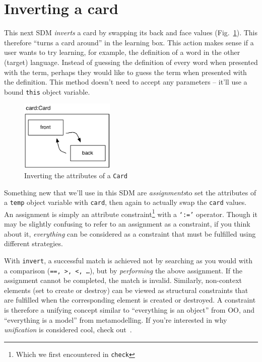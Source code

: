 \newpage
\hypertarget{sec:invertCard}{}
\section{Inverting a card}
\genHeader

This next SDM \emph{inverts} a card by swapping its back and face values (Fig.~\ref{fig:goal_invert}). This therefore ``turns a card around'' in the learning
box. This action makes sense if a user wants to try learning, for example, the definition of a word in the other (target) language. Instead of guessing the
definition of every word when presented with the term, perhaps they would like to guess the term when presented with the definition. This method doesn't need to
accept any parameters -- it'll use a bound \texttt{this} object variable.

\vspace{0.5cm}

\begin{figure}[htbp]
	\centering
    \includegraphics[width=0.4\textwidth]{goal_invert.pdf}
 	\caption{Inverting the attributes of a \texttt{Card}}
 	\label{fig:goal_invert}
\end{figure}
\FloatBarrier

Something new that we'll use in this SDM are \emph{assignments}to set the attributes of a \texttt{temp} object variable with \texttt{card},
then again to actually swap the \texttt{card} values. An assignment is simply an attribute constraint\footnote{Which we first encountered in \texttt{check}}
with a \texttt{`:='} operator. Though it may be slightly confusing to refer to an assignment as a constraint, if you think about it, \emph{everything} can be
considered as a constraint that must be fulfilled using different strategies.

With \texttt{invert}, a successful match is achieved not by searching as you would with a comparison (\texttt{==, >, <, \ldots}), but by \emph{performing} the
above assignment. If the assignment cannot be completed, the match is invalid. Similarly, non-context elements (set to create or destroy) can be viewed as
structural constraints that are fulfilled when the corresponding element is created or destroyed.  A constraint is therefore a unifying concept similar to
``everything is an object'' from OO, and ``everything is a model'' from metamodelling.  If you're interested in why \emph{unification} is considered cool, check
out~\cite{BEZ05}.








